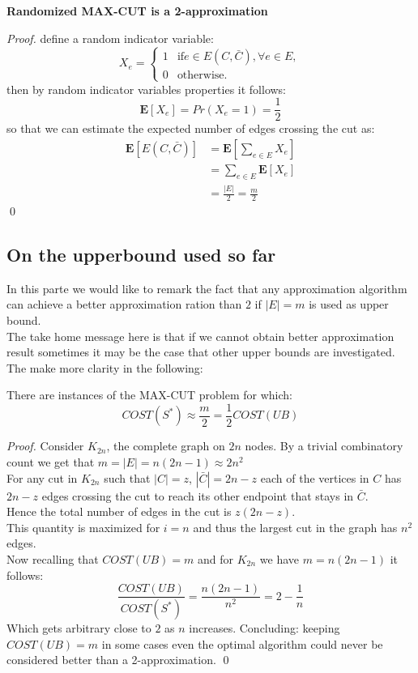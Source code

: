 \begin{theorem}{} 
	\textbf{Randomized MAX-CUT is a 2-approximation}
\end{theorem}
\begin{proof}
	define a random indicator variable:
\begin{equation*}
	X_{e} = 
	  \begin{cases}
	    1 &  \text{if} e \in E(C,\bar{C}), \forall e \in E,\\
        0 &  \text{otherwise}.
	  \end{cases}
\end{equation*}
then by random indicator variables properties it follows:
\[ \mathbf{E}[X_{e}] = Pr(X_{e} = 1) = \frac{1}{2} \]
so that we can estimate the expected number of edges crossing the cut as:
\begin{align}
\mathbf{E}[E(C,\bar{C})] & = \mathbf{E}[\sum_{e \in E} X_{e}] \\
						 & = \sum_{e \in E} \mathbf{E}[X_{e}] \\
						 & = \frac{|E|}{2} = \frac{m}{2}
\end{align}
\qed
\end{proof}


\subsection{On the upperbound used so far}
In this parte we would like to remark the fact that any approximation algorithm can achieve a better approximation ration than $ 2 $ if $ |E|=m $ is used as upper bound.\\
The take home message here is that if we cannot obtain better approximation result sometimes it may be the case that other upper bounds are investigated.
The make more clarity in the following:
\begin{claim}
	There are instances of the MAX-CUT problem for which:
	\[COST(S^{*}) \approx \frac{m}{2} = \frac{1}{2} COST(UB) \]
\end{claim}
\begin{proof}
Consider $ K_{2n} $, the complete graph on $ 2n $ nodes. By a trivial combinatory count we get that $ m = |E|= n(2n-1) \approx 2n^2 $\\
For any cut in $ K_{2n} $ such that $ |C|= z $, $ |\bar{C}|= 2n-z $ each of the vertices in $ C $ has $ 2n-z $ edges crossing the cut to reach its other endpoint that stays in $ \bar{C} $.\\
Hence the total number of edges in the cut is $ z(2n-z) $.\\
This quantity is maximized for $ i=n $ and thus the largest cut in the graph has $ n^2 $ edges.\\
Now recalling that $ COST(UB)=m $ and for $ K_{2n} $ we have $ m=n(2n-1) $ it follows:
\[ \frac{COST(UB)}{COST(S^{*})} = \frac{n(2n-1)}{n^2} = 2 - \frac{1}{n}  \]
Which gets arbitrary close to $ 2 $ as $ n $ increases.
Concluding: keeping $ COST(UB)=m $ in some cases even the optimal algorithm could never be considered better than a 2-approximation.
\qed
\end{proof}

